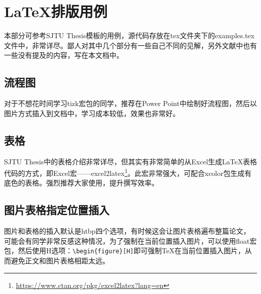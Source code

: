 
\chapter{\LaTeX 排版用例}\label{chap:example}

本部分可参考SJTU Thesis模板\cite{SJTUThesis}的用例，源代码存放在tex文件夹下的examples.tex文件中，非常详尽。鄙人对其中几个部分有一些自己不同的见解，另外文献中也有一些没有提及的内容，写在本文档中。

\section{流程图}

对于不想花时间学习tizk宏包的同学，推荐在Power Point中绘制好流程图，然后以图片方式插入到文档中，学习成本较低，效果也非常好。

\section{表格}

SJTU Thesis中的表格介绍非常详尽，但其实有非常简单的从Excel生成\LaTeX 表格代码的方式，即Excel宏——excel2latex\footnote{\url{https://www.ctan.org/pkg/excel2latex?lang=en}}。此宏非常强大，可配合xcolor包生成有底色的表格。强烈推荐大家使用，提升撰写效率。

\section{图片表格指定位置插入}

图片和表格的插入默认是htbp四个选项，有时候这会让图片表格遍布整篇论文，可能会有同学非常反感这种情况，为了强制在当前位置插入图片，可以使用float宏包，然后使用H选项：\verb+\begin{figure}[H]+即可强制\TeX 在当前位置插入图片，从而避免正文和图片表格相距太远。
